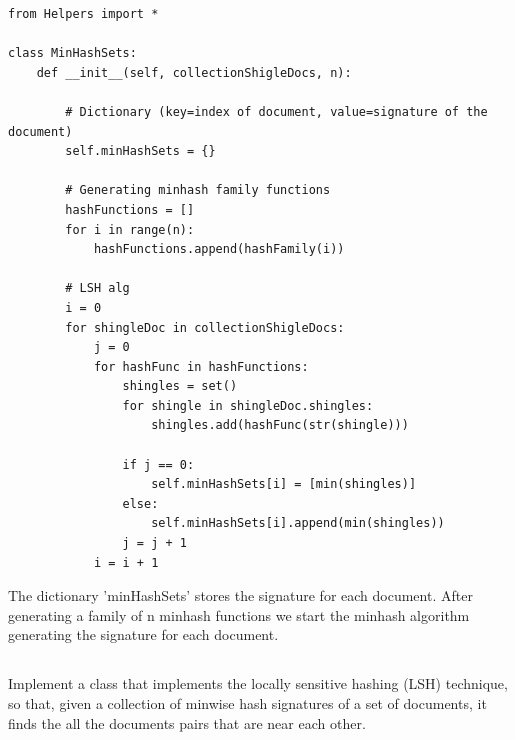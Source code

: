 \documentclass{article}
\begin{document}
\begin{lstlisting} 
from Helpers import *

class MinHashSets:
    def __init__(self, collectionShigleDocs, n):

        # Dictionary (key=index of document, value=signature of the document)
        self.minHashSets = {}

        # Generating minhash family functions
        hashFunctions = []
        for i in range(n):
            hashFunctions.append(hashFamily(i))

        # LSH alg
        i = 0
        for shingleDoc in collectionShigleDocs:
            j = 0
            for hashFunc in hashFunctions:
                shingles = set()
                for shingle in shingleDoc.shingles:
                    shingles.add(hashFunc(str(shingle)))

                if j == 0:
                    self.minHashSets[i] = [min(shingles)]
                else:
                    self.minHashSets[i].append(min(shingles))
                j = j + 1
            i = i + 1
\end{lstlisting}

The dictionary 'minHashSets' stores the signature for each document. After generating a family of n minhash functions we start the minhash algorithm generating the signature for each document.




\subsection{}
Implement a class that implements the locally sensitive hashing (LSH) technique, so that, given a collection of minwise hash signatures of a set of documents, it finds the all the documents pairs that are near each other.
\end{document}
